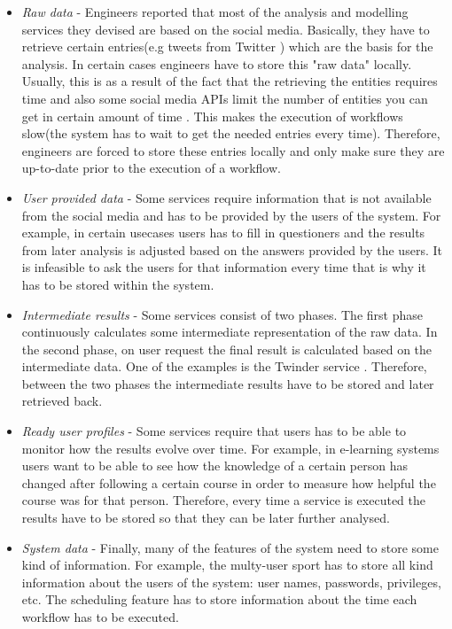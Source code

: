 \begin{itemize}

	\item \textit{Raw data} - Engineers reported that most of the analysis and modelling services they devised are based on the social media. Basically, they have to retrieve certain entries(e.g tweets from Twitter ) which are the basis for the analysis. In certain cases engineers have to store this "raw data" locally. Usually, this is as a result of the fact that the retrieving the entities requires time and also some social media APIs limit the number of entities you can get in certain amount of time \cite{Cheong09}. This makes the execution of workflows slow(the system has to wait to get the needed entries every time). Therefore, engineers are forced to store these entries locally and only make sure they are up-to-date prior to the execution of a workflow.
	
	\item \textit{User provided data} - Some services require information that is not available from the social media and has to be provided by the users of the system. For example, in certain usecases users has to fill in questioners and the results from later analysis is adjusted based on the answers provided by the users. It is infeasible to ask the users for that information every time that is why it has to be stored within the system.
	
	\item \textit{Intermediate results} - Some services consist of two phases. The first phase continuously calculates some intermediate representation of the raw data. In the second phase, on user request the final result is calculated based on the intermediate data. One of the examples is the Twinder service \cite{Ke12}. Therefore, between the two phases the intermediate results have to be stored and later retrieved back.
	
	\item \textit{Ready user profiles} - Some services require that users has to be able to monitor how the results evolve over time. For example, in e-learning systems users want to be able to see how the knowledge of a certain person has changed after following a certain course in order to measure how helpful the course was for that person. Therefore, every time a service is executed the results have to be stored so that they can be later further analysed.
	
	\item \textit{System data} - Finally, many of the features of the system need to store some kind of information. For example, the multy-user sport has to store all kind information about the users of the system: user names, passwords, privileges, etc. The scheduling feature has to store information about the time each workflow has to be executed. 
	
\end{itemize}

